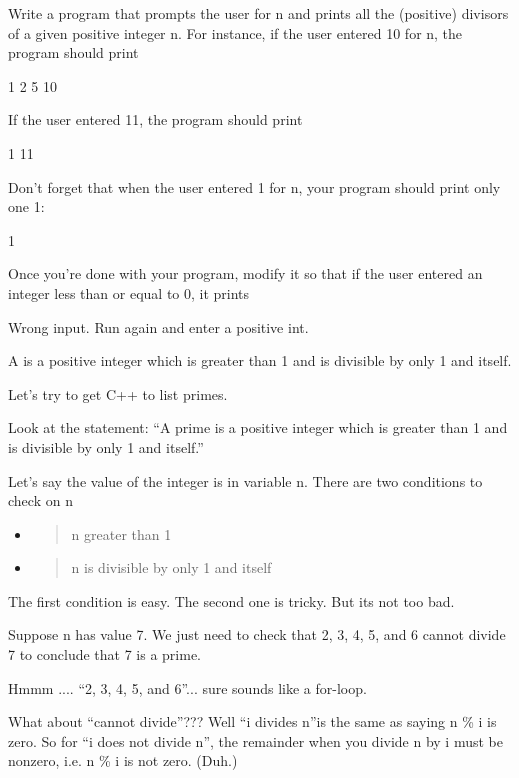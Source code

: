\begin{console}
\begin{ex}
Write a program that prompts the user for n and
prints all the (positive) divisors of a given positive integer n. For
instance, if the user entered 10 for n, the program should print
\begin{console}
1
2
5
10
\end{console}
If the user entered 11, the program should print
\begin{console}
1
11
\end{console}
Don't forget that when the user entered 1 for n, your
program should print only one 1:
\begin{console}
1
\end{console}
Once you're done with your program, modify it so that if
the user entered an integer less than or equal to 0, it prints
\begin{console}
Wrong input. Run again and enter a positive int.
\end{console}
\end{ex}
A  is a positive integer which is greater than 1 and is
divisible by only 1 and itself.

Let's try to get C++ to list primes.

Look at the statement: ``A prime is a positive integer which is greater
than 1 and is divisible by only 1 and itself.''

Let's say the value of the integer is in variable n.
There are two conditions to check on n

\begin{itemize}
\item
  \begin{quote}
  n greater than 1
  \end{quote}
\item
  \begin{quote}
  n is divisible by only 1 and itself
  \end{quote}
\end{itemize}

The first condition is easy. The second one is tricky. But its not too
bad.

Suppose n has value 7. We just need to check that 2, 3, 4, 5, and 6
cannot divide 7 to conclude that 7 is a prime.

Hmmm .... ``2, 3, 4, 5, and 6''... sure sounds like a for-loop.

What about ``cannot divide''??? Well ``i divides n''is the same as
saying n \% i is zero. So for ``i does not divide n'', the remainder
when you divide n by i must be nonzero, i.e. n \% i is not zero. (Duh.)


\end{console}
